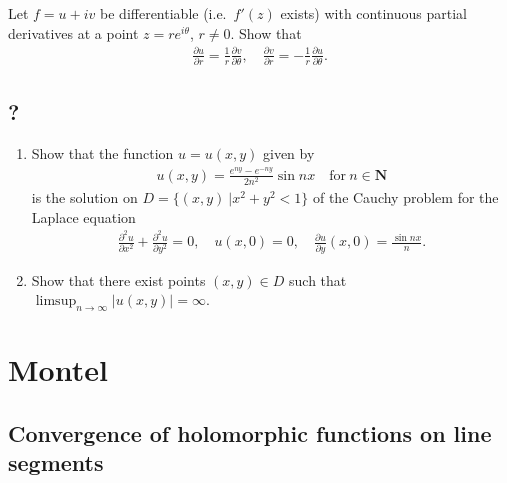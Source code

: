 Let \(f=u+iv\) be differentiable (i.e.~\(f'(z)\) exists) with continuous
partial derivatives at a point \(z=re^{i\theta}\), \(r\not= 0\). Show
that
\begin{align*}
\frac{\partial u}{\partial r}=\frac{1}{r}\frac{\partial v}{\partial \theta},\quad
\frac{\partial v}{\partial r}=-\frac{1}{r}\frac{\partial u}{\partial \theta}
.\end{align*}

\hypertarget{section-9}{%
\subsection{?}\label{section-9}}

\begin{enumerate}
\def\labelenumi{\arabic{enumi}.}
\item
  Show that the function \(u=u(x,y)\) given by
  \begin{align*}
  u(x,y)=\frac{e^{ny}-e^{-ny}}{2n^2}\sin nx\quad \text{for}\ n\in {\mathbf N}
  \end{align*}
  is the solution on \(D=\{(x,y)\ | x^2+y^2<1\}\) of the Cauchy problem
  for the Laplace equation
  \begin{align*}\frac{\partial ^2u}{\partial x^2}+\frac{\partial ^2u}{\partial y^2}=0,\quad
  u(x,0)=0,\quad \frac{\partial u}{\partial y}(x,0)=\frac{\sin nx}{n}.\end{align*}
\item
  Show that there exist points \((x,y)\in D\) such that
  \(\displaystyle{\limsup_{n\to\infty} |u(x,y)|=\infty}\).
\end{enumerate}

\hypertarget{montel}{%
\section{Montel}\label{montel}}

\hypertarget{convergence-of-holomorphic-functions-on-line-segments}{%
\subsection{Convergence of holomorphic functions on line
segments}\label{convergence-of-holomorphic-functions-on-line-segments}}

